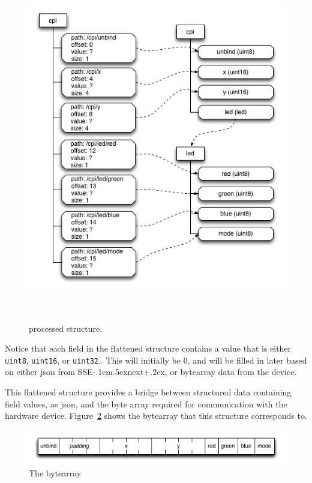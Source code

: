 \documentclass[12pt]{article}
\def\SSEnext{SSE\kern-.1em\lower.5ex\hbox{\footnotesize next}\kern+.2ex}
\def\SSEnext{SSE\kern-.1em\lower.5ex\hbox{\footnotesize next}\kern+.2ex}
\begin{document}
\begin{figure}[htbp] %
   \centering
   \includegraphics[height=6in]{flat_structure.png} 
\caption{processed structure.}
\label{fig:flattened}
\end{figure}

Notice that each field in the flattened structure contains a value
that is either \verb|uint8|, \verb|uint16|, or \verb|uint32|..
This will initially be 0, and will be filled in later based on either json
from \SSEnext, or bytearray data from the device.

This flattened structure provides a bridge between structured data
containing field values, as json, and the byte array required for
communication with the hardware device. Figure~\ref{fig:bytearray}
shows the bytearray that this structure corresponds to.

\begin{figure}[htbp] %
   \centering
   \includegraphics[width=6in]{bytearray.png} 
\caption{The bytearray}
\label{fig:bytearray}
\end{figure}
\end{document}
